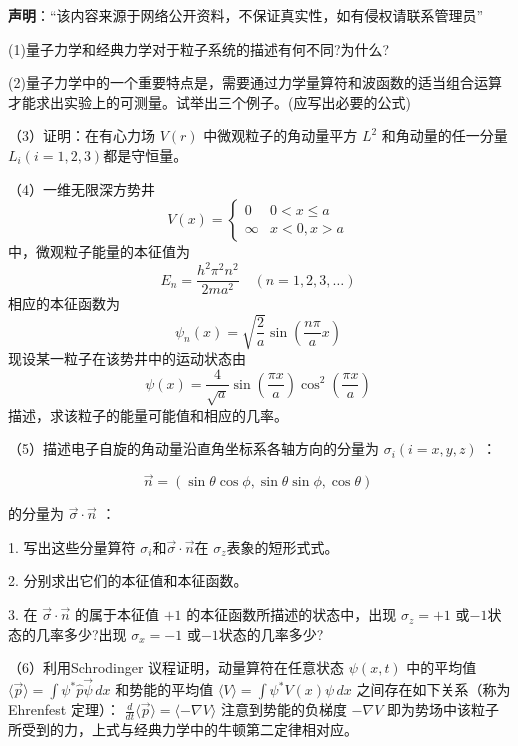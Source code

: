 
\textbf{声明}：“该内容来源于网络公开资料，不保证真实性，如有侵权请联系管理员”

(1)量子力学和经典力学对于粒子系统的描述有何不同?为什么?

(2)量子力学中的一个重要特点是，需要通过力学量算符和波函数的适当组合运算才能求出实验上的可测量。试举出三个例子。(应写出必要的公式)

（3）证明：在有心力场 $V(r)$ 中微观粒子的角动量平方 $ L^2 $ 和角动量的任一分量 $L_i (i=1,2,3)$都是守恒量。

（4）一维无限深方势井
$$V(x) = 
\begin{cases} 
0 & 0 < x \leq a \\
\infty & x < 0, x > a 
\end{cases}~$$
中，微观粒子能量的本征值为
$$E_n = \frac{h^2 \pi^2 n^2}{2ma^2} \quad (n = 1, 2, 3, \ldots)~$$
相应的本征函数为
$$\psi_n(x) = \sqrt{\frac{2}{a}} \sin \left( \frac{n \pi }{a} x \right)~$$
现设某一粒子在该势井中的运动状态由
$$\psi(x) = \frac{4}{\sqrt{a}} \sin \left( \frac{\pi x}{a} \right) \cos^2 \left( \frac{\pi x}{a} \right)~$$
描述，求该粒子的能量可能值和相应的几率。

（5）描述电子自旋的角动量沿直角坐标系各轴方向的分量为 $\sigma_i (i=x,y,z)$ ：

$$\vec{n} = (\sin \theta \cos \phi, \sin \theta \sin \phi, \cos \theta)~$$

的分量为 $\vec{\sigma} \cdot \vec{n}$ ：

1. 写出这些分量算符 $\sigma_i$和$\vec{\sigma} \cdot \vec{n}$在 $\sigma_z$表象的短形式式。

2. 分别求出它们的本征值和本征函数。

3. 在 $\vec{\sigma} \cdot \vec{n}$ 的属于本征值 $+1$ 的本征函数所描述的状态中，出现 $\sigma_z = +1$ 或$-1$状态的几率多少?出现 $\sigma_x = -1$ 或$-1$状态的几率多少?

（6）利用Schrodinger 议程证明，动量算符在任意状态 $\psi(x,t)$ 中的平均值
$\langle \vec{p} \rangle = \int \psi^* \hat{p} \vec{\psi}\, dx $
和势能的平均值
$\langle V \rangle = \int \psi^* V(x) \psi \, dx $
之间存在如下关系（称为Ehrenfest 定理）：
$ \frac{d}{dt} \langle \vec{p} \rangle = \langle -\nabla V \rangle $
注意到势能的负梯度 $ - \nabla V $ 即为势场中该粒子所受到的力，上式与经典力学中的牛顿第二定律相对应。